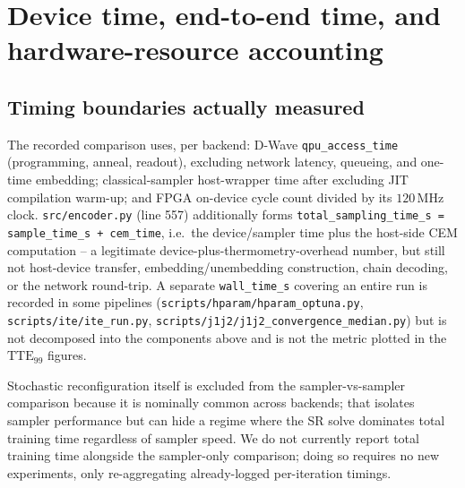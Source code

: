 \section{Device time, end-to-end time, and hardware-resource accounting}
\label{sec:resources}

\subsection{Timing boundaries actually measured}

The recorded comparison uses, per backend: D-Wave \texttt{qpu\_access\_time} (programming, anneal, readout), excluding network latency, queueing, and one-time embedding; classical-sampler host-wrapper time after excluding JIT compilation warm-up; and FPGA on-device cycle count divided by its $120\,\mathrm{MHz}$ clock. \texttt{src/encoder.py} (line 557) additionally forms \texttt{total\_sampling\_time\_s = sample\_time\_s + cem\_time}, i.e.\ the device/sampler time plus the host-side CEM computation -- a legitimate device-plus-thermometry-overhead number, but still not host-device transfer, embedding/unembedding construction, chain decoding, or the network round-trip. A separate \texttt{wall\_time\_s} covering an entire run is recorded in some pipelines (\texttt{scripts/hparam/hparam\_optuna.py}, \texttt{scripts/ite/ite\_run.py}, \texttt{scripts/j1j2/j1j2\_convergence\_median.py}) but is not decomposed into the components above and is not the metric plotted in the $\mathrm{TTE}_{99}$ figures.


Stochastic reconfiguration itself is excluded from the sampler-vs-sampler comparison because it is nominally common across backends; that isolates sampler performance but can hide a regime where the SR solve dominates total training time regardless of sampler speed. We do not currently report total training time alongside the sampler-only comparison; doing so requires no new experiments, only re-aggregating already-logged per-iteration timings.

